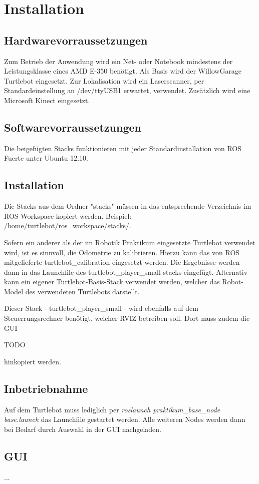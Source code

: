 \chapter{Installation}
\section{Hardwarevorraussetzungen}
Zum Betrieb der Anwendung wird ein Net- oder Notebook mindestens der Leistungsklasse eines AMD E-350 benötigt. Als Basis wird der WillowGarage Turtlebot eingesetzt. Zur Lokalisation wird ein Laserscanner, per Standardeinstellung an /dev/ttyUSB1 erwartet, verwendet. Zusätzlich wird eine Microsoft Kinect eingesetzt.

\section{Softwarevorraussetzungen}
Die beigefügten Stacks funktionieren mit jeder Standardinstallation von ROS Fuerte unter Ubuntu 12.10.

\section{Installation}
Die Stacks aus dem Ordner "stacks" müssen in das entsprechende Verzeichnis im ROS Workspace kopiert werden. Beispiel: /home/turtlebot/ros\_workspace/stacks/.

Sofern ein anderer als der im Robotik Praktikum eingesetzte Turtlebot verwendet wird, ist es sinnvoll, die Odometrie zu kalibrieren. Hierzu kann das von ROS mitgelieferte turtlebot\_calibration eingesetzt werden. Die Ergebnisse werden dann in das Launchfile des turtlebot\_player\_small stacks eingefügt. Alternativ kann ein eigener Turtlebot-Basis-Stack verwendet werden, welcher das Robot-Model des verwendeten Turtlebots darstellt.

Dieser Stack - turtlebot\_player\_small - wird ebenfalls auf dem Steuerrungsrechner benötigt, welcher RVIZ betreiben soll. Dort muss zudem die GUI

TODO

hinkopiert werden.

\section{Inbetriebnahme}
Auf dem Turtlebot muss lediglich per \emph{roslaunch praktikum\_base\_node base.launch} das Launchfile gestartet werden. Alle weiteren Nodes werden dann bei Bedarf durch Auswahl in der GUI nachgeladen.

\section{GUI}
...

